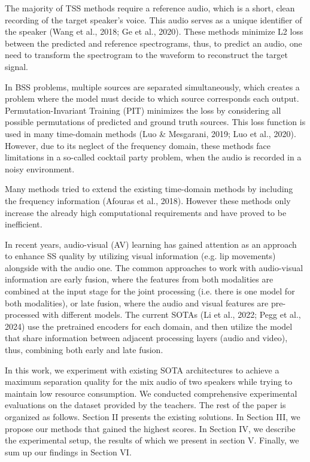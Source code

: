 \documentclass[10pt,conference,compsocconf]{IEEEtran}
\begin{document}
The majority of TSS methods require a reference audio, which is a short, clean recording of the target speaker's voice. This audio serves as a unique identifier of the speaker (Wang et al., 2018\cite{wang2019voicefilter}; Ge et al., 2020\cite{ge2020spexplus}). These methods minimize L2 loss between the predicted and reference spectrograms, thus, to predict an audio, one need to transform the spectrogram to the waveform to reconstruct the target signal.

In BSS problems, multiple sources are separated simultaneously, which creates a problem where the model must decide to which source corresponds each output. Permutation-Invariant Training (PIT)\cite{yu2017permutation} minimizes the loss by considering all possible permutations of predicted and ground truth sources. This loss function is used in many time-domain methods (Luo \& Mesgarani, 2019\cite{luo2018tasnet}; Luo et al., 2020\cite{luo2019convtasnet}). However, due to its neglect of the frequency domain, these methods face limitations in a so-called cocktail party problem, when the audio is recorded in a noisy environment. 

Many methods tried to extend the existing time-domain methods by including the frequency information (Afouras et al., 2018\cite{afouras2018deep}). However these methods only increase the already high computational requirements and have proved to be inefficient.

In recent years, audio-visual (AV) learning has gained attention as an approach to enhance SS quality by utilizing visual information (e.g. lip movements) alongside with the audio one. The common approaches to work with audio-visual information are early fusion, where the features from both modalities are combined at the input stage for the joint processing (i.e. there is one model for both modalities), or late fusion, where the audio and visual features are pre-processed with different models. The current SOTAs (Li et al., 2022; Pegg et al., 2024) use the pretrained encoders for each domain, and then utilize the model that share information between adjacent processing layers (audio and video), thus, combining both early and late fusion.

In this work, we experiment with existing SOTA architectures to achieve a maximum separation quality for the mix audio of two speakers while trying to maintain low resource consumption. We conducted comprehensive experimental evaluations on the dataset provided by the teachers.  The rest of the paper is organized as follows. Section II presents the existing solutions. In Section III, we propose our methods that gained the highest scores. In Section IV, we describe the experimental setup, the results of which we present in section V. Finally, we sum up our findings in Section VI.
\end{document}
